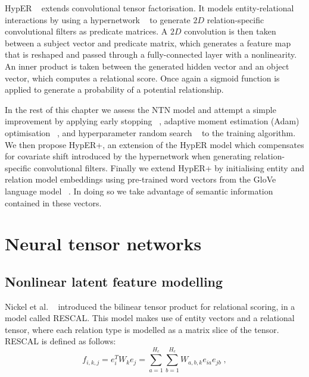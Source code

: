 \noindent HypER \unskip~\citep{balazevic2019hypernetwork} extends convolutional tensor factorisation. It models entity-relational interactions by using a hypernetwork \unskip~\citep{ha2016hypernetworks} to generate $ 2D $ relation-specific convolutional filters as predicate matrices. A $ 2D $ convolution is then taken between a subject vector and predicate matrix, which generates a feature map that is reshaped and passed through a fully-connected layer with a nonlinearity. An inner product is taken between the generated hidden vector and an object vector, which computes a relational score. Once again a sigmoid function is applied to generate a probability of a potential relationship. \par

\noindent In the rest of this chapter we assess the NTN model and attempt a simple improvement by applying early stopping \unskip ~\citep{prechelt1998early}, adaptive moment estimation (Adam) optimisation \unskip ~\citep{kingma2014adam}, and hyperparameter random search \unskip ~\citep{bergstra2012random} to the training algorithm. We then propose HypER+, an extension of the HypER model which compensates for covariate shift introduced by the hypernetwork when generating relation-specific convolutional filters. Finally we extend HypER+ by initialising entity and relation model embeddings using pre-trained word vectors from the GloVe language model \unskip ~\citep{pennington2014glove}. In doing so we take advantage of semantic information contained in these vectors. 



\section{Neural tensor networks}

\subsection{Nonlinear latent feature modelling}
Nickel et al. \unskip ~\citep{nickel2011three} introduced the bilinear tensor product for relational scoring, in a model called RESCAL. This model makes use of entity vectors and a relational tensor, where each relation type is modelled as a matrix slice of the tensor. RESCAL is defined as follows:
\begin{equation}
	f_{i, k, j} = e_i^TW_ke_j = \sum_{a=1}^{H_e}\sum_{b=1}^{H_e}W_{a,b,k}e_{ia}e_{jb} \; ,
\end{equation}

